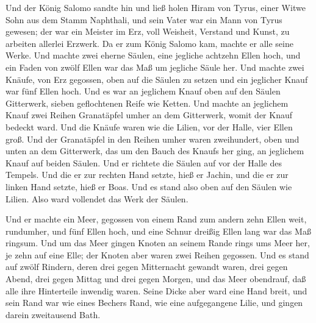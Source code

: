  Und der König Salomo sandte hin und ließ holen Hiram von
Tyrus,  einer Witwe Sohn aus dem Stamm Naphthali, und sein
Vater war ein Mann von Tyrus gewesen; der war ein Meister im Erz, voll
Weisheit, Verstand und Kunst, zu arbeiten allerlei Erzwerk. Da er zum
König Salomo kam, machte er alle seine Werke.  Und machte
zwei eherne Säulen, eine jegliche achtzehn Ellen hoch, und ein Faden von
zwölf Ellen war das Maß um jegliche Säule her.  Und machte
zwei Knäufe, von Erz gegossen, oben auf die Säulen zu setzen und ein
jeglicher Knauf war fünf Ellen hoch.  Und es war an
jeglichem Knauf oben auf den Säulen Gitterwerk, sieben geflochtenen
Reife wie Ketten.  Und machte an jeglichem Knauf zwei
Reihen Granatäpfel umher an dem Gitterwerk, womit der Knauf bedeckt
ward.  Und die Knäufe waren wie die Lilien, vor der Halle,
vier Ellen groß.  Und der Granatäpfel in den Reihen umher
waren zweihundert, oben und unten an dem Gitterwerk, das um den Bauch
des Knaufs her ging, an jeglichem Knauf auf beiden Säulen. 
Und er richtete die Säulen auf vor der Halle des Tempels. Und die er zur
rechten Hand setzte, hieß er Jachin, und die er zur linken Hand setzte,
hieß er Boas.  Und es stand also oben auf den Säulen wie
Lilien. Also ward vollendet das Werk der Säulen.

 Und er machte ein Meer, gegossen von einem Rand zum andern
zehn Ellen weit, rundumher, und fünf Ellen hoch, und eine Schnur dreißig
Ellen lang war das Maß ringsum.  Und um das Meer gingen
Knoten an seinem Rande rings ums Meer her, je zehn auf eine Elle; der
Knoten aber waren zwei Reihen gegossen.  Und es stand auf
zwölf Rindern, deren drei gegen Mitternacht gewandt waren, drei gegen
Abend, drei gegen Mittag und drei gegen Morgen, und das Meer obendrauf,
daß alle ihre Hinterteile inwendig waren.  Seine Dicke aber
ward eine Hand breit, und sein Rand war wie eines Bechers Rand, wie eine
aufgegangene Lilie, und gingen darein zweitausend Bath.


